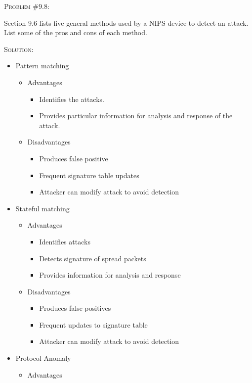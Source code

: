 \documentclass[12pt]{article}
\newenvironment{problem}[1]
{\begin{mdframed}[linewidth=0.8pt]
        \textsc{Problem #1:}

}
    {\end{mdframed}}
\newenvironment{solution}
    {\textsc{Solution:}\\}
    {\newpage}%
\begin{document}
	\begin{problem}{\#9.8}
		Section 9.6 lists five general methods used by a NIPS device to detect an attack. List some of the pros and cons of each method.
	\end{problem}
	\begin{solution}
		\begin{itemize}
			\item Pattern matching
				\begin{itemize}
					\item Advantages
						\begin{itemize}
							\item Identifies the attacks.
							\item Provides particular information for analysis and response of the attack.
						\end{itemize}
					\item Disadvantages
						\begin{itemize}
							\item Produces false positive
							\item Frequent signature table updates
							\item Attacker can modify attack to avoid detection
						\end{itemize}
				\end{itemize}
			\item Stateful matching
				\begin{itemize}
					\item Advantages
						\begin{itemize}
							\item Identifies attacks
							\item Detects signature of spread packets
							\item Provides information for analysis and response
						\end{itemize}
					\item Disadvantages
						\begin{itemize}
							\item Produces false positives
							\item Frequent updates to signature table
							\item Attacker can modify attack to avoid detection
						\end{itemize}
				\end{itemize}
			\item Protocol Anomaly
				\begin{itemize}
					\item Advantages

\end{itemize}
\end{itemize}
\end{solution}
\end{document}
